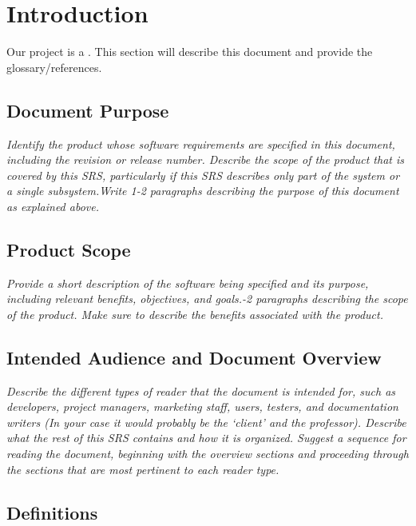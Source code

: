 
\section{Introduction}\label{sec:introduction}
    Our project is a \todo. This section will describe this document and provide the glossary/references.
    \subsection{Document Purpose}\label{sec:document-purpose}
        \emph{Identify the product whose software requirements are specified in this document, including the revision or release number. Describe the scope of the product that is covered by this SRS, particularly if this SRS describes only part of the system or a single subsystem.\gnl Write 1-2 paragraphs describing the purpose of this document as explained above.}
    \subsection{Product Scope}\label{sec:product-scope}
        \emph{Provide a short description of the software being specified and its purpose, including relevant benefits, objectives, and goals.-2 paragraphs describing the scope of the product. Make sure to describe the benefits associated with the product.}
    \subsection{Intended Audience and Document Overview}\label{sec:audience-overview}
        \emph{Describe the different types of reader that the document is intended for, such as developers, project managers, marketing staff, users, testers, and documentation writers (In your case it would probably be the `client' and the professor). Describe what the rest of this SRS contains and how it is organized. Suggest a sequence for reading the document, beginning with the overview sections and proceeding through the sections that are most pertinent to each reader type.}
    \subsection{Definitions}\label{sec:definitions}
        \printnoidxglossary
        \printnoidxglossary[type=acronym, title=Acronyms and Abbreviations]
        \printacronyms
    \vspace{-4ex} %

